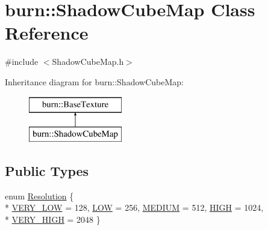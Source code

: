 \hypertarget{classburn_1_1_shadow_cube_map}{\section{burn\-:\-:Shadow\-Cube\-Map Class Reference}
\label{classburn_1_1_shadow_cube_map}
}


{\ttfamily \#include $<$Shadow\-Cube\-Map.\-h$>$}

Inheritance diagram for burn\-:\-:Shadow\-Cube\-Map\-:\begin{figure}[H]
\begin{center}
\leavevmode
\includegraphics[height=2.000000cm]{classburn_1_1_shadow_cube_map}
\end{center}
\end{figure}
\subsection*{Public Types}
\begin{DoxyCompactItemize}
\item 
enum \hyperlink{classburn_1_1_shadow_cube_map_a199f4c817b2cadb4f3b93c270c4f209e}{Resolution} \{ \\*
\hyperlink{classburn_1_1_shadow_cube_map_a199f4c817b2cadb4f3b93c270c4f209ea879262ad62b035c8d4b20c0eaac7896c}{V\-E\-R\-Y\-\_\-\-L\-O\-W} = 128, 
\hyperlink{classburn_1_1_shadow_cube_map_a199f4c817b2cadb4f3b93c270c4f209ea04beb22bfc324a3458294be49d313c9c}{L\-O\-W} = 256, 
\hyperlink{classburn_1_1_shadow_cube_map_a199f4c817b2cadb4f3b93c270c4f209ea880badf96feef25667391e15b62516e0}{M\-E\-D\-I\-U\-M} = 512, 
\hyperlink{classburn_1_1_shadow_cube_map_a199f4c817b2cadb4f3b93c270c4f209eadec66121357f641252b33af54af06eab}{H\-I\-G\-H} = 1024, 
\\*
\hyperlink{classburn_1_1_shadow_cube_map_a199f4c817b2cadb4f3b93c270c4f209eab857a7ffa30e1ef01b8eece6667473a5}{V\-E\-R\-Y\-\_\-\-H\-I\-G\-H} = 2048
 \}
\end{DoxyCompactItemize}
